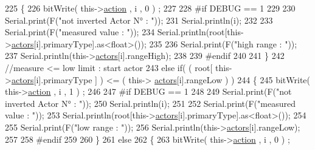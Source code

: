 \begin{DoxyCode}
225                         \{   
226                             bitWrite( this->\hyperlink{class_jetpack_aca3142925a7b0834b34ae91d26af7765}{action} , i , 0 ) ;    
227 
228 \textcolor{preprocessor}{                        #if DEBUG == 1}
229                             
230                             Serial.print(F(\textcolor{stringliteral}{"not inverted Actor N° : "}));
231                             Serial.println(i);
232 
233                             Serial.print(F(\textcolor{stringliteral}{"measured value : "}));
234                             Serial.println(root[this->\hyperlink{class_jetpack_a7e16d2f97837f9712a2e6de1c50d99db}{actors}[i].primaryType].as<float>());
235 
236                             Serial.print(F(\textcolor{stringliteral}{"high range : "}));
237                             Serial.println(this->\hyperlink{class_jetpack_a7e16d2f97837f9712a2e6de1c50d99db}{actors}[i].rangeHigh);
238                         
239 \textcolor{preprocessor}{                        #endif}
240                         
241                         \}
242                         \textcolor{comment}{//measure <= low limit : start actor}
243                         \textcolor{keywordflow}{else} \textcolor{keywordflow}{if}( ( root[ this->\hyperlink{class_jetpack_a7e16d2f97837f9712a2e6de1c50d99db}{actors}[i].primaryType ] ) <= ( this->
      \hyperlink{class_jetpack_a7e16d2f97837f9712a2e6de1c50d99db}{actors}[i].rangeLow ) )
244                         \{
245                             bitWrite( this->\hyperlink{class_jetpack_aca3142925a7b0834b34ae91d26af7765}{action} , i , 1 ) ;
246 
247 \textcolor{preprocessor}{                        #if DEBUG == 1}
248 
249                             Serial.print(F(\textcolor{stringliteral}{"not inverted Actor N° : "}));
250                             Serial.println(i);
251 
252                             Serial.print(F(\textcolor{stringliteral}{"measured value : "}));
253                             Serial.println(root[this->\hyperlink{class_jetpack_a7e16d2f97837f9712a2e6de1c50d99db}{actors}[i].primaryType].as<float>());
254 
255                             Serial.print(F(\textcolor{stringliteral}{"low range : "}));
256                             Serial.println(this->\hyperlink{class_jetpack_a7e16d2f97837f9712a2e6de1c50d99db}{actors}[i].rangeLow);
257                         
258 \textcolor{preprocessor}{                        #endif}
259                                             
260                         \}
261                         \textcolor{keywordflow}{else} 
262                         \{
263                             bitWrite( this->\hyperlink{class_jetpack_aca3142925a7b0834b34ae91d26af7765}{action} , i , 0 ) ;                        

\end{DoxyCode}

